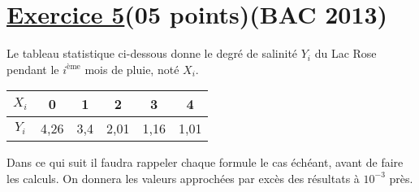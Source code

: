 \documentclass[12pt,a4paper]{article}
\begin{document}
\section*{\underline{Exercice 5}(05 points)(BAC 2013)}
\noindent
Le tableau statistique ci-dessous donne le degré de salinité \( Y_i \) du Lac Rose pendant le \( i^\text{ème} \) mois de pluie, noté \( X_i \).

\vspace{0.4cm}

\begin{center}
\begin{tabular}{|c|c|c|c|c|c|}
\hline
\( X_i \) & 0 & 1 & 2 & 3 & 4 \\
\hline
\( Y_i \) & 4{,}26 & 3{,}4 & 2{,}01 & 1{,}16 & 1{,}01 \\
\hline
\end{tabular}
\end{center}

\vspace{0.5cm}

Dans ce qui suit il faudra rappeler chaque formule le cas échéant, avant de faire les calculs. On donnera les valeurs approchées par excès des résultats à \( 10^{-3} \) près.

\vspace{0.5cm}
\end{document}
